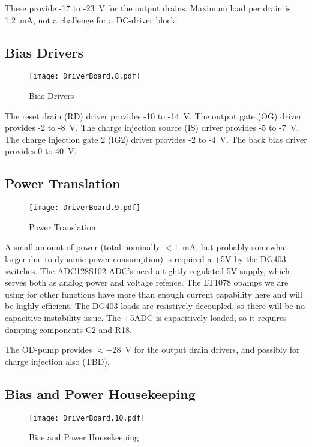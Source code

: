 \documentclass[a4paper,12pt]{article}
\begin{document}
These provide -17 to -23\ V for the output drains. Maximum load per drain is 1.2\ mA, not a challenge for a DC-driver block.  

\subsection{Bias Drivers}
   \begin{figure}
   \begin{center}
   \texttt{[image: DriverBoard.8.pdf]}
   \end{center}
   \caption{Bias Drivers}
   \end{figure}
  
The reset drain (RD) driver provides -10 to -14\ V. 
The output gate (OG) driver provides -2 to -8\ V.
The charge injection source (IS) driver provides -5 to -7\ V.
The charge injection gate 2 (IG2) driver provides -2 to -4\ V.
The back bias driver provides 0 to 40\ V.

\subsection{Power Translation}
   \begin{figure}
   \begin{center}
   \texttt{[image: DriverBoard.9.pdf]}
   \end{center}
   \caption{Power Translation}
   \end{figure}
  
A small amount of power (total nominally $<1$\ mA, but probably somewhat larger due to dynamic power consumption) is required a +5V by the DG403 switches. The ADC128S102 ADC's need a tightly regulated 5V supply, which serves both as analog power and voltage refence. The LT1078 opamps we are using for other functions have more than enough current capability here and will be highly efficient. The DG403 loads are resistively decoupled, so there will be no capacitive instability issue. The +5ADC is capacitively loaded, so it requires damping components C2 and R18.
  
The OD-pump provides $\approx -28$\ V for the output drain drivers, and possibly for charge injection also (TBD).

\subsection{Bias and Power Housekeeping}
   \begin{figure}
   \begin{center}
   \texttt{[image: DriverBoard.10.pdf]}
   \end{center}
   \caption{Bias and Power Housekeeping}
   \end{figure}
\end{document}
